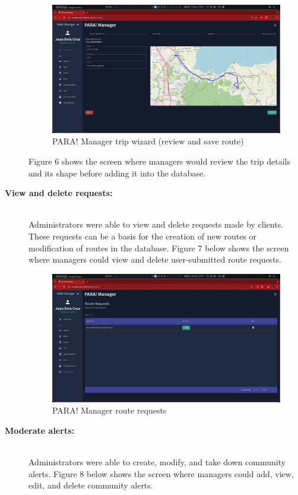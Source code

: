 \documentclass[journal]{./IEEE/IEEEtran}
\begin{document}
\begin{description}
\begin{figure}[!h]
    \centering
        \includegraphics[scale=0.115]{./figures/manager/trip wizard 4.jpeg}
    \caption{PARA! Manager trip wizard (review and save route)}
\end{figure}

Figure 6 shows the screen where managers would review the trip details and its shape before adding it into the database. \hfill \\

    \item[\textbf{View and delete requests:}] \hfill \\
       Administrators were able to view and delete requests made by clients. These requests can be a basis for the creation of new routes or modification of routes in the database.
Figure 7 below shows the screen where managers could view and delete user-submitted route requests.

\begin{figure}[!h]
    \centering
        \includegraphics[scale=0.115]{./figures/manager/route request.jpeg}
    \caption{PARA! Manager route requests}
\end{figure}
    
    \item[\textbf{Moderate alerts:}] \hfill \\
       Administrators were able to create, modify, and take down community alerts.
       Figure 8 below shows the screen where managers could add, view, edit, and delete community alerts.
\end{description}
\end{document}
